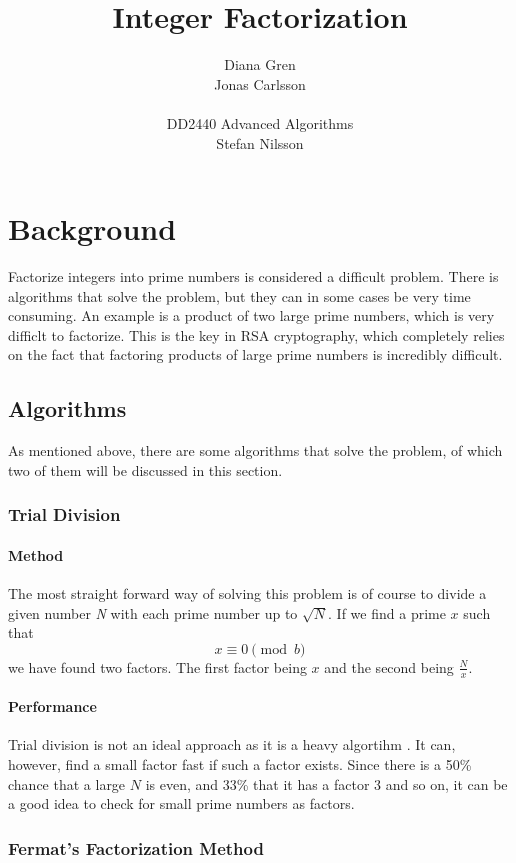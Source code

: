 \documentclass[a4paper, 12pt]{report}
\title{Integer Factorization}
\author{Diana Gren \\ Jonas Carlsson \\\\ DD2440 Advanced Algorithms \\ Stefan Nilsson}
\date{}
\begin{document}
\maketitle
\tableofcontents
\newpage
\chapter{Background}
Factorize integers into prime numbers is considered a difficult problem. There is algorithms that solve the problem, but they can in some cases be very time consuming. An example is a product of two large prime numbers, which is very difficlt to factorize. This is the key in RSA cryptography, which completely relies on the fact that factoring products of large prime numbers is incredibly difficult.

\section{Algorithms}
As mentioned above, there are some algorithms that solve the problem, of which two of them will be discussed in this section.

\subsection{Trial Division}
\subsubsection{Method}
The most straight forward way of solving this problem is of course to divide a given number \emph{N} with each prime number up to $ \sqrt{N} $. If we find a prime $x$ such that
\begin{equation}
x \equiv 0 \pmod b
\end{equation}
we have found two factors. The first factor being $x$ and the second being $ \frac{N}{x} $.

\subsubsection{Performance}
Trial division is not an ideal approach as it is a heavy algortihm \cite{trial}. It can, however, find a small factor fast if such a factor exists. Since there is a 50\% chance that a large $N$ is even, and 33\% that it has a factor 3 and so on, it can be a good idea to check for small prime numbers as factors.

\subsection{Fermat's Factorization Method}
\end{document}
